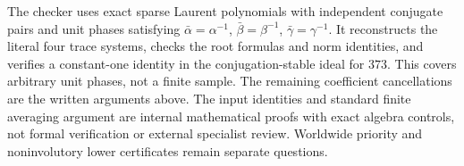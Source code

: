 \documentclass[11pt]{article}
\begin{document}
The checker 
uses exact sparse Laurent polynomials with independent conjugate
pairs and unit phases satisfying $\bar\alpha=\alpha^{-1}$,
$\bar\beta=\beta^{-1}$, $\bar\gamma=\gamma^{-1}$.
It reconstructs the literal four trace systems, checks the root
formulas and norm identities, and verifies a constant-one identity
in the conjugation-stable ideal for $373$. This covers arbitrary
unit phases, not a finite sample. The remaining coefficient
cancellations are the written arguments above.
The input identities and standard finite averaging argument are
internal mathematical proofs with exact algebra controls, not
formal verification or external specialist review. Worldwide priority
and noninvolutory lower certificates remain separate questions.
\end{document}
